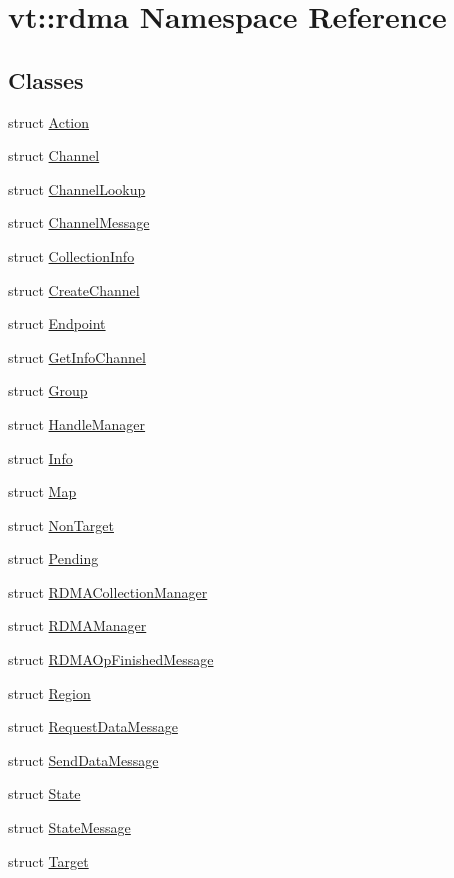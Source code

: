 \hypertarget{namespacevt_1_1rdma}{}\section{vt\+:\+:rdma Namespace Reference}
\label{namespacevt_1_1rdma}
\subsection*{Classes}
\begin{DoxyCompactItemize}
\item 
struct \hyperlink{structvt_1_1rdma_1_1_action}{Action}
\item 
struct \hyperlink{structvt_1_1rdma_1_1_channel}{Channel}
\item 
struct \hyperlink{structvt_1_1rdma_1_1_channel_lookup}{Channel\+Lookup}
\item 
struct \hyperlink{structvt_1_1rdma_1_1_channel_message}{Channel\+Message}
\item 
struct \hyperlink{structvt_1_1rdma_1_1_collection_info}{Collection\+Info}
\item 
struct \hyperlink{structvt_1_1rdma_1_1_create_channel}{Create\+Channel}
\item 
struct \hyperlink{structvt_1_1rdma_1_1_endpoint}{Endpoint}
\item 
struct \hyperlink{structvt_1_1rdma_1_1_get_info_channel}{Get\+Info\+Channel}
\item 
struct \hyperlink{structvt_1_1rdma_1_1_group}{Group}
\item 
struct \hyperlink{structvt_1_1rdma_1_1_handle_manager}{Handle\+Manager}
\item 
struct \hyperlink{structvt_1_1rdma_1_1_info}{Info}
\item 
struct \hyperlink{structvt_1_1rdma_1_1_map}{Map}
\item 
struct \hyperlink{structvt_1_1rdma_1_1_non_target}{Non\+Target}
\item 
struct \hyperlink{structvt_1_1rdma_1_1_pending}{Pending}
\item 
struct \hyperlink{structvt_1_1rdma_1_1_r_d_m_a_collection_manager}{R\+D\+M\+A\+Collection\+Manager}
\item 
struct \hyperlink{structvt_1_1rdma_1_1_r_d_m_a_manager}{R\+D\+M\+A\+Manager}
\item 
struct \hyperlink{structvt_1_1rdma_1_1_r_d_m_a_op_finished_message}{R\+D\+M\+A\+Op\+Finished\+Message}
\item 
struct \hyperlink{structvt_1_1rdma_1_1_region}{Region}
\item 
struct \hyperlink{structvt_1_1rdma_1_1_request_data_message}{Request\+Data\+Message}
\item 
struct \hyperlink{structvt_1_1rdma_1_1_send_data_message}{Send\+Data\+Message}
\item 
struct \hyperlink{structvt_1_1rdma_1_1_state}{State}
\item 
struct \hyperlink{structvt_1_1rdma_1_1_state_message}{State\+Message}
\item 
struct \hyperlink{structvt_1_1rdma_1_1_target}{Target}
\end{DoxyCompactItemize}

